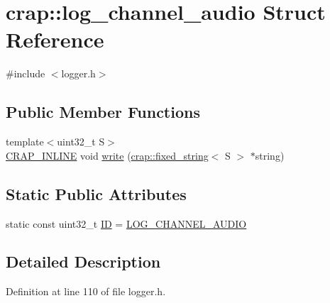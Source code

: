 \hypertarget{structcrap_1_1log__channel__audio}{\section{crap\+:\+:log\+\_\+channel\+\_\+audio Struct Reference}
\label{structcrap_1_1log__channel__audio}
}


{\ttfamily \#include $<$logger.\+h$>$}

\subsection*{Public Member Functions}
\begin{DoxyCompactItemize}
\item 
{\footnotesize template$<$uint32\+\_\+t S$>$ }\\\hyperlink{config__x86_8h_a5a40526b8d842e7ff731509998bb0f1c}{C\+R\+A\+P\+\_\+\+I\+N\+L\+I\+N\+E} void \hyperlink{structcrap_1_1log__channel__audio_a28a9c9acc9c857e40e0c6a2995f7d9cf}{write} (\hyperlink{classcrap_1_1fixed__string}{crap\+::fixed\+\_\+string}$<$ S $>$ $\ast$string)
\end{DoxyCompactItemize}
\subsection*{Static Public Attributes}
\begin{DoxyCompactItemize}
\item 
static const uint32\+\_\+t \hyperlink{structcrap_1_1log__channel__audio_aed8432decd9efdd91407fa4dee2f598a}{I\+D} = \hyperlink{logger_8h_a14df61b1bef702b4e7b845577658561b}{L\+O\+G\+\_\+\+C\+H\+A\+N\+N\+E\+L\+\_\+\+A\+U\+D\+I\+O}
\end{DoxyCompactItemize}


\subsection{Detailed Description}


Definition at line 110 of file logger.\+h.



